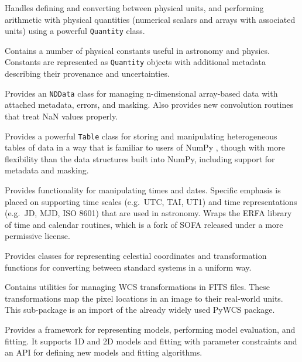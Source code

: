 \documentclass[11pt,twoside]{article}
\begin{document}
Handles defining and converting between physical units, and performing
arithmetic with physical quantities (numerical scalars and arrays with
associated units) using a powerful \texttt{Quantity} class.


Contains a number of physical constants useful in astronomy and physics.
Constants are represented as \texttt{Quantity} objects with additional metadata
describing their provenance and uncertainties.


Provides an \texttt{NDData} class for managing n-dimensional array-based data
with attached metadata, errors, and masking.  Also provides new convolution
routines that treat NaN values properly.


Provides a powerful \texttt{Table} class for storing and manipulating
heterogeneous tables of data in a way that is familiar to users of NumPy
\citep{oliphant2006guide,van2011numpy}, though with more flexibility than the
data structures built into NumPy, including support for metadata and masking.

Provides functionality for manipulating times and dates.  Specific emphasis is
placed on supporting time scales (e.g.~UTC, TAI, UT1) and time representations
(e.g.~JD, MJD, ISO 8601) that are used in astronomy.  Wraps the ERFA library of
time and calendar routines, which is a fork of SOFA \citep{Hohenkerk:2010}
released under a more permissive license.


Provides classes for representing celestial coordinates and transformation
functions for converting between standard systems in a uniform way.


Contains utilities for managing WCS transformations in FITS files.  These
transformations map the pixel locations in an image to their real-world units.
This sub-package is an import of the already widely used PyWCS package.


Provides a framework for representing models, performing model evaluation, and
fitting.  It supports 1D and 2D models and fitting with parameter constraints
and an API for defining new models and fitting algorithms.
\end{document}
